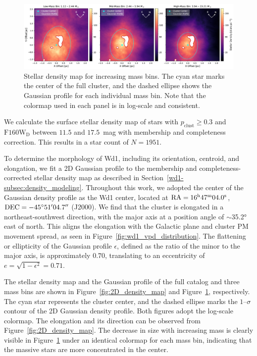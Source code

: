 \documentclass[12pt]{ucsddissertation}
\begin{document}
\begin{CJK*}{UTF8}{gbsn}
\begin{figure}[htb!]
    \centering
    \includegraphics[width = \linewidth]{figures/chapter2/3_panel_density_check_plot_log.pdf}
    \caption[Stellar density map for increasing mass bins]{Stellar density map for increasing mass bins. The cyan star marks the center of the full cluster, and the dashed ellipse shows the Gaussian profile for each individual mass bin. Note that the colormap used in each panel is in log-scale and consistent.}
    \label{fig:binned_density}
\end{figure}
We calculate the surface stellar density map of stars with $p_\mathrm{clust} \geq 0.3$ and $\mathrm{F160W_D}$ between $11.5$ and $17.5$~mag with membership and completeness correction. This results in a star count of $N = 1951$. 

To determine the morphology of Wd1, including its orientation, centroid, and elongation, we fit a 2D Gaussian profile to the membership and completeness-corrected stellar density map as described in Section~\ref{wd1-subsec:density_modeling}. Throughout this work, we adopted the center of the Gaussian density profile as the Wd1 center, located at $\mathrm{RA}=16^{\textnormal{h}} 47^{\textnormal{m}} 04.0^{\textnormal{s}}$, $\mathrm{DEC}=\ang{-45} 51\mbox{$^\prime$} 04.7\mbox{$^{\prime\prime}$}$ (J2000). We find that the cluster is elongated in a northeast-southwest direction, with the major axis at a position angle of $\sim$\ang{35.2} 
east of north. This aligns the elongation with the Galactic plane and cluster PM movement spread, as seen in Figure~\ref{fig:wd1_vpd_distribution}. The flattening or ellipticity of the Gaussian profile $\epsilon$, defined as the ratio of the minor to the major axis, is approximately $0.70$, translating to an eccentricity of $e = \sqrt{1 - \epsilon^2} = 0.71$. 

The stellar density map and the Gaussian profile of the full catalog and three mass bins are shown in Figure~\ref{fig:2D_density_map} and Figure~\ref{fig:binned_density}, respectively. The cyan star represents the cluster center, and the dashed ellipse marks the $1$--$\sigma$ contour of the 2D Gaussian density profile. Both figures adopt the log-scale colormap. The elongation and its direction can be observed from Figure~\ref{fig:2D_density_map}. The decrease in size with increasing mass is clearly visible in Figure~\ref{fig:binned_density} under an identical colormap for each mass bin, indicating that the massive stars are more concentrated in the center.



\end{CJK*}
\end{document}
